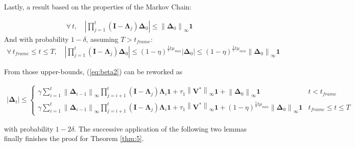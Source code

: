 Lastly, a result based on the properties of the Markov Chain:

\begin{lem}[Lemma 2]\label{lem:2}
  \begin{align}
    \forall \, t,\quad \left| \prod_{j=1}^{t}(\mathbf{I}-\mathbf{\Lambda}_j)\mathbf{\Delta}_0 \right| \leq \left\| \mathbf{\Delta}_0 \right\|_\infty \mathbf{1}\label{eq:lem2-1}
  \end{align}
  And with probability $1-\delta$, assuming $T > t_{frame}$:
  \begin{align}
    \forall \, t_{frame} \leq t \leq T,\quad \left| \prod_{j=1}^{t}(\mathbf{I}-\mathbf{\Lambda}_j)\mathbf{\Delta}_0 \right| \leq (1-\eta)^{\frac{1}{2}t \mu_{min}} \left| \mathbf{\Delta}_0 \right| \leq (1-\eta)^{\frac{1}{2}t \mu_{min}} \left\| \mathbf{\Delta}_0 \right\|_\infty \mathbf{1} \label{eq:lem2-2}
  \end{align}
\end{lem}

From those upper-bounds, (\ref{eq:beta2}) can be reworked as

\begin{align}
  \left| \mathbf{\Delta}_t \right| \leq \begin{cases} \gamma \sum_{i=1}^{t}\left\| \mathbf{\Delta}_{i-1} \right\|_\infty \prod_{j=i+1}^{t} (\mathbf{I}-\mathbf{\Lambda}_j)\mathbf{\Lambda}_i \mathbf{1} + \tau_1 \left\| \mathbf{V}^* \right\|_\infty \mathbf{1} + \left\| \mathbf{\Delta}_0 \right\|_\infty \mathbf{1} & t < t_{frame}\\ \gamma \sum_{i=1}^{t}\left\| \mathbf{\Delta}_{i-1} \right\|_\infty \prod_{j=i+1}^{t} (\mathbf{I}-\mathbf{\Lambda}_j)\mathbf{\Lambda}_i \mathbf{1} + \tau_1 \left\| \mathbf{V}^* \right\|_\infty \mathbf{1} + (1-\eta)^{\frac{1}{2}t \mu_{min}} \left\| \mathbf{\Delta}_0 \right\|_\infty \mathbf{1} & t_{frame} \leq t \leq T\end{cases}\label{eq:delta-UB}
\end{align}

with probability $1 - 2\delta$. The successive application of the following two lemmas finally finishes the proof for Theorem \ref{thm:5}.

